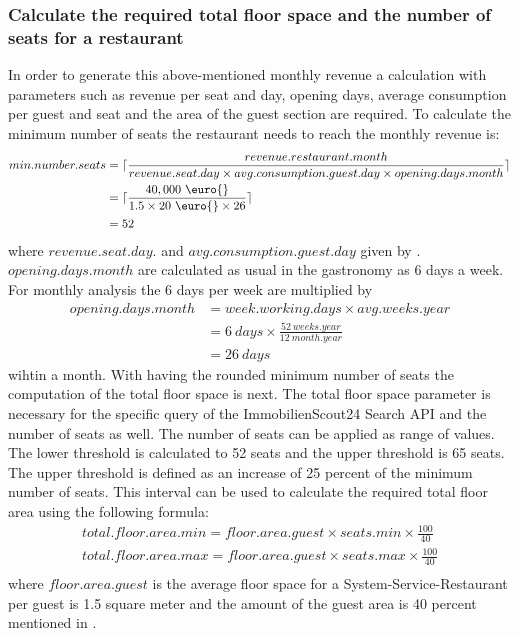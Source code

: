 \subsubsection{Calculate the required total floor space and the number of seats for a restaurant}
In order to generate this above-mentioned monthly revenue a calculation with parameters such as revenue per seat and day,
 opening days, average consumption per guest and seat and the area of the guest section are required. To calculate the
 minimum number of seats the restaurant needs to reach the monthly revenue is:
\begin{equation}
\begin{aligned}
	min.number.seats & = \lceil\frac{revenue.restaurant.month}{revenue.seat.day \times avg.consumption.guest.day \times opening.days.month}\rceil \\
	& = \lceil\frac{40,000 \ \text{\euro{}} }{1.5 \times 20 \ \text{\euro{}} \times 26}\rceil \\
	& = 52
\end{aligned}
\label{eq:number_seats_benchmark}
\end{equation}
where $revenue.seat.day.$ and $avg.consumption.guest.day$ given by \cite{BenchmarkGastronomie}. $opening.days.month$
 are calculated as usual in the gastronomy as 6 days a week. For monthly analysis the 6 days per week are multiplied by
\begin{equation}
    \begin{aligned}
        opening.days.month & = week.working.days \times avg.weeks.year \\
        & = 6 \ days \times \frac{52 \ weeks.year}{12 \ month.year} \\
        & = 26 \ days
    \end{aligned}
    \label{eq:opening_days}
\end{equation}
wihtin a month.\newline
With having the rounded minimum number of seats the computation of the total floor space is next. The total
 floor space parameter is necessary for the specific query of the ImmobilienScout24 Search API \cite{ImmoScout} and
 the number of seats as well. The number of seats can be applied as range of values. The lower threshold is calculated to 52 seats and
 the upper threshold is 65 seats. The upper threshold is defined as an increase of 25 percent of the minimum number of seats.
 This interval can be used to calculate the required total floor area using the following formula:
\begin{equation}
    \begin{aligned}
        total.floor.area.min = floor.area.guest \times seats.min \times \frac{100}{40} \\
        total.floor.area.max = floor.area.guest \times seats.max \times \frac{100}{40} \\
    \end{aligned}
    \label{eq:total_floor_space}
\end{equation}
where $floor.area.guest$ is the average floor space for a System-Service-Restaurant per guest is 1.5 square meter \cite{FlaecheGast} and the
 amount of the guest area is 40 percent mentioned in \cite{FlaecheGastronomie}.
